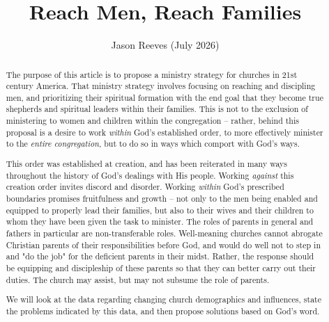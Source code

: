 

\title{Reach Men, Reach Families}
\author{Jason Reeves (July 2026)}
\date{}



\ifdefined\embedversion
  \pagestyle{empty}
\fi

\maketitle
{}

\begin{abstract}
The purpose of this article is to propose a ministry strategy for churches in 21st century America.  That ministry strategy involves focusing on reaching and discipling men, and prioritizing their spiritual formation with the end goal that they become true shepherds and spiritual leaders within their families.  This is not to the exclusion of ministering to women and children within the congregation -- rather, behind this proposal is a desire to work \textit{within} God's established order, to more effectively minister to the \textit{entire congregation}, but to do so in ways which comport with God's ways. 

This order was established at creation, and has been reiterated in many ways throughout the history of God's dealings with His people.  Working \textit{against} this creation order invites discord and disorder.  Working \textit{within} God's prescribed boundaries promises fruitfulness and growth -- not only to the men being enabled and equipped to properly lead their families, but also to their wives and their children to whom they have been given the task to minister.  The roles of parents in general and fathers in particular are non-transferable roles.  Well-meaning churches cannot abrogate Christian parents of their responsibilities before God, and would do well not to step in and "do the job" for the deficient parents in their midst.  Rather, the response should be equipping and discipleship of these parents so that they can better carry out their duties.  The church may assist, but may not subsume the role of parents.

We will look at the data regarding changing church demographics and influences, state the problems indicated by this data, and then propose solutions based on God's word.
\end{abstract}

